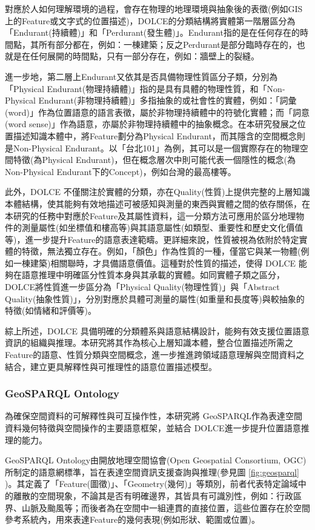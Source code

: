 對應於人如何理解環境的過程，會存在物理的地理環境與抽象後的表徵(例如GIS上的Feature或文字式的位置描述)，DOLCE的分類結構將實體第一階層區分為「Endurant(持續體)」和「Perdurant(發生體)」。Endurant指的是在任何存在的時間點，其所有部分都在，例如：一棟建築；反之Perdurant是部分臨時存在的，也就是在任何展開的時間點，只有一部分存在，例如：牆壁上的裂縫。

進一步地，第二層上Endurant又依其是否具備物理性質區分子類，分別為「Physical Endurant(物理持續體)」指的是具有具體的物理性質，和「Non-Physical Endurant(非物理持續體)」多指抽象的或社會性的實體，例如：「詞彙(word)」作為位置語意的語言表徵，屬於非物理持續體中的符號化實體；而「詞意(word sense)」作為語意，亦屬於非物理持續體中的抽象概念。在本研究發展之位置描述知識本體中，將Feature劃分為Physical Endurant，而其隱含的空間概念則是Non-Physical Endurant。以「台北101」為例，其可以是一個實際存在的物理空間特徵(為Physical Endurant)，但在概念層次中則可能代表一個隱性的概念(為Non-Physical Endurant下的Concept)，例如台灣的最高樓等。

此外，DOLCE 不僅關注於實體的分類，亦在Quality(性質)上提供完整的上層知識本體結構，使其能夠有效地描述可被感知與測量的東西與實體之間的依存關係，在本研究的任務中對應於Feature及其屬性資料，這一分類方法可應用於區分地理物件的測量屬性(如坐標值和樓高等)與其語意屬性(如類型、重要性和歷史文化價值等)，進一步提升Feature的語意表達範疇。更詳細來說，性質被視為依附於特定實體的特徵，無法獨立存在。例如，「顏色」作為性質的一種，僅當它與某一物體(例如一棟建築)相關聯時，才具備語意價值。這種對於性質的描述，使得 DOLCE 能夠在語意推理中明確區分性質本身與其承載的實體。如同實體子類之區分，DOLCE將性質進一步區分為「Physical Quality(物理性質)」與「Abstract Quality(抽象性質)」，分別對應於具體可測量的屬性(如重量和長度等)與較抽象的特徵(如情緒和評價等)。

綜上所述，DOLCE 具備明確的分類體系與語意結構設計，能夠有效支援位置語意資訊的組織與推理。本研究將其作為核心上層知識本體，整合位置描述所需之Feature的語意、性質分類與空間概念，進一步推進跨領域語意理解與空間資料之結合，建立更具解釋性與可推理性的語意位置描述模型。

\subsubsection{GeoSPARQL Ontology}

為確保空間資料的可解釋性與可互操作性，本研究將 GeoSPARQL作為表達空間資料幾何特徵與空間操作的主要語意框架，並結合 DOLCE進一步提升位置語意推理的能力。

GeoSPARQL Ontology由開放地理空間協會(Open Geospatial Consortium, OGC)所制定的語意網標準，旨在表達空間資訊支援查詢與推理(參見圖 \ref{fig:geosparql} )。其定義了「Feature(圖徵)」、「Geometry(幾何)」等類別，前者代表特定論域中的離散的空間現象，不論其是否有明確邊界，其皆具有可識別性，例如：行政區界、山脈及颱風等；而後者為在空間中一組連貫的直接位置，這些位置存在於空間參考系統內，用來表達Feature的幾何表現(例如形狀、範圍或位置)。

